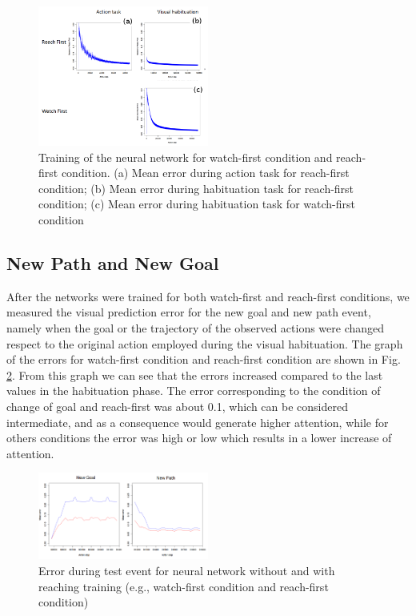 \documentclass[conference]{IEEEtran}
\begin{document}
\begin{figure}
\centering
\includegraphics[width=0.5\textwidth,natwidth=700,natheight=450]{AT_HT.png}
\caption{Training of the neural network for watch-first condition and reach-first condition. (a) Mean error during action task for reach-first condition; (b) Mean error during habituation task for reach-first condition; (c) Mean error during habituation task for watch-first condition}
\label{Error}
\end{figure}

\subsection{New Path and New Goal}
After the networks were trained for both watch-first and reach-first conditions, we measured the visual prediction error for the new goal and new path event, namely when the goal or the trajectory of the observed actions were changed respect to the original action employed during the visual habituation. The graph of the errors for watch-first condition and reach-first condition are shown in Fig. \ref{figure7}. From this graph we can see that the errors increased compared to the last values in the habituation phase. The error corresponding to the condition of change of goal and reach-first was about 0.1, which can be considered intermediate, and as a consequence would generate higher attention, while for others conditions the error was high or low which results in a lower increase of attention.

\begin{figure}
\centering
\includegraphics[width=0.5\textwidth,natwidth=700,natheight=450]{TT.png}
\caption{Error during test event for neural network without and with reaching training (e.g., watch-first condition and reach-first condition)}
\label{figure7}
\end{figure}
\end{document}
